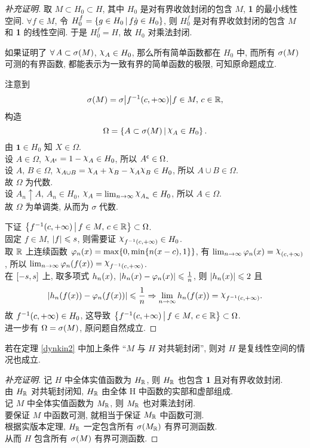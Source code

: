 \begin{proof}[补充证明]
取 $M\subset H_0\subset H$, 其中 $H_0$ 是对有界收敛封闭的包含 $M$, \textbf{1} 的最小线性空间. $\forall f\in M$, 令 $H_0^f=\left\{g\in H_0\,\middle\vert\,f\dot g\in H_0\right\}$, 则 $H_0^f$ 是对有界收敛封闭的包含 $M$ 和 \textbf{1} 的线性空间. 于是 $H_0^f=H$, 故 $H_0$ 对乘法封闭.\par 
如果证明了 $\forall A\subset\sigma\xk{M}$, $\rchi_A\in H_0$, 那么所有简单函数都在 $H_0$ 中, 而所有 $\sigma\xk{M}$ 可测的有界函数, 都能表示为一致有界的简单函数的极限, 可知原命题成立.\par 
注意到
\[\sigma\xk{M}=\sigma\jd{f^{-1}\xk{c,+\infty}}{f\in M,\,c\in \rr},\]
构造
\[\Omega=\jh{A\subset\sigma\xk{M}}{\rchi_A\in H_0}.\]
由 $\mathbf{1}\in H_0$ 知 $X\in\Omega$.\\
设 $A\in\Omega$, $\rchi_{A\bu}=1-\rchi_A\in H_0$, 所以 $A^{\mathsf{c}}\in\Omega$.\\
设 $A,\,B\in\Omega$, $\rchi_{A\cup B}=\rchi_A+\rchi_B-\rchi_A\rchi_B\in H_0$, 所以 $A\cup B\in\Omega$.\\
故 $\Omega$ 为代数.\\
设 $A_n\uparrow A$, $A_n\in H_0$, $\rchi_A=\lim _{n\toi}\rchi_{A_n}\in H_0$, 所以 $A\in\Omega$.\\
故 $\Omega$ 为单调类, 从而为 $\sigma$ 代数.\par 
下证 $\jh{f^{-1}\xk{c,+\infty}}{f\in M,\,c\in\rr}\subset\Omega$.\\
固定 $f\in M$, $\left\vert f\right\vert\leqslant s$, 则需要证 $\rchi_{f^{-1}\xk{c,+\infty}}\in H_0$.\\
取 $\mathbb{R}$ 上连续函数 $\phi_n\xk{x}=\max\dk{0,\min\dk{n\xk{x-c},1}}$, 有 $\lim _{n\toi}\phi_n\xk{x}=\rchi_{\xk{c,+\infty}}$, 所以 $\lim _{n\toi}\phi_n\xk{f\xk{x}}=\rchi_{f^{-1}\xk{c,+\infty}}$.\\
在 $\left[-s,s\right]$ 上, 取多项式 $h_n\xk{x}$, $\jd{h_n\xk{x}-\phi_n\xk{x}}\leq\frac1n$, 则 $\jd{h_n\xk{x}}\leq 2$ 且
\[\jd{h_n\xk{f\xk{x}}-\phi_n\xk{f\xk{x}}}\leq\frac{1}{n}\Rightarrow \lim _{n\toi}h_n\xk{f\xk{x}}=\rchi_{f^{-1}\xk{c,+\infty}}.\]
故 $f^{-1}\xk{c,+\infty}\in H_0$, 这导致 $\jh{f^{-1}\xk{c,+\infty}}{f\in M,\,c\in\rr}\subset\Omega$.\\
进一步有 $\Omega=\sigma\xk{M}$, 原问题自然成立.
\end{proof}
\begin{theorem}
若在定理 \ref{dynkin2} 中加上条件 ``$M$ 与 $H$ 对共轭封闭'', 则对 $H$ 是复线性空间的情况也成立.
\end{theorem}
\begin{proof}[补充证明]
记 $H$ 中全体实值函数为 $H_{\mathbb{R}}$, 则 $H_{\mathbb{R}}$ 也包含 \textbf{1} 且对有界收敛封闭.\\
由 $H_{\mathbb{R}}$ 对共轭封闭知, $H_{\mathbb{R}}$ 由全体 H 中函数的实部和虚部组成.\\
记 $M$ 中全体实值函数为 $M_{\mathbb{R}}$, 则 $M_{\mathbb{R}}$ 也对乘法封闭.\\
要保证 $M$ 中函数可测, 就相当于保证 $M_{\mathbb{R}}$ 中函数可测.\\
根据实版本定理, $H_{\mathbb{R}}$ 一定包含所有 $\sigma\xk{M_{\rr}}$ 有界可测函数.\\
从而 $H$ 包含所有 $\sigma\xk{M}$ 有界可测函数.
\end{proof}
